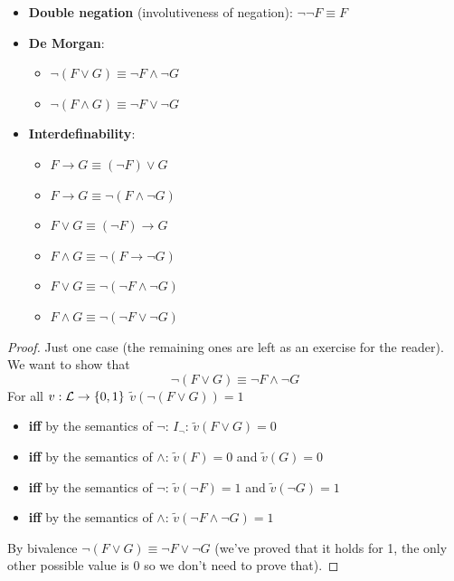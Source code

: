 	\begin{itemize}
		\item \textbf{Double negation} (involutiveness of negation): $\neg \neg F \equiv F$

		\item \textbf{De Morgan}:
		\begin{itemize}
			\item $\neg (F \vee G) \equiv \neg F \wedge \neg G$
			\item $\neg (F \wedge G) \equiv \neg F \vee \neg G$
		\end{itemize}

		\item \textbf{Interdefinability}:
		\begin{itemize}
			\item $F \rightarrow G \equiv (\neg F) \vee G$
			\item $F \rightarrow G \equiv \neg (F \wedge \neg G)$
			\item $F \vee G \equiv (\neg F) \rightarrow G$
			\item $F \wedge G \equiv \neg (F \rightarrow \neg G)$
			\item $F \vee G \equiv \neg (\neg F \wedge \neg G)$
			\item $F \wedge G \equiv \neg (\neg F \vee \neg G)$
		\end{itemize}
	\end{itemize}

	\begin{proof}
		Just one case (the remaining ones are left as an exercise for the reader). We want to show that
		$$ \neg (F \vee G) \equiv \neg F \wedge \neg G$$
		For all $v: \mathcal{L} \rightarrow \{0,1\}$ $\tilde{v} (\neg (F \vee G)) = 1$
		\begin{itemize}[label*=]
			\item \textbf{iff} by the semantics of $\neg$: $I_\neg$: $\tilde{v} (F \vee G) = 0$
			\item \textbf{iff} by the semantics of $\wedge$: $\tilde{v} (F) = 0$ and $\tilde{v}(G) = 0$
			\item \textbf{iff} by the semantics of $\neg$: $\tilde{v} (\neg F) = 1$ and $\tilde{v} (\neg G) = 1$
			\item \textbf{iff} by the semantics of $\wedge$: $\tilde{v} (\neg F \wedge \neg G) = 1$
		\end{itemize}

		\noindent
		By bivalence $\neg (F \vee G) \equiv \neg F \vee \neg G$ (we've proved that it holds for 1, the only other possible value is 0 so we don't need to prove that).
	\end{proof} \vspace{-0.5cm}

